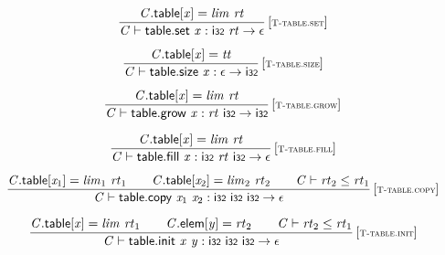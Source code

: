 $$
\begin{array}{@{}c@{}}\displaystyle
\frac{
{\mathit{C}}.\mathsf{table}{}[{\mathit{x}}] = {\mathit{lim}}~{\mathit{rt}}
}{
{\mathit{C}} \vdash \mathsf{table.set}~{\mathit{x}} : \mathsf{i{\scriptstyle32}}~{\mathit{rt}} \rightarrow \epsilon
} \, {[\textsc{\scriptsize T{-}table.set}]}
\qquad
\end{array}
$$

$$
\begin{array}{@{}c@{}}\displaystyle
\frac{
{\mathit{C}}.\mathsf{table}{}[{\mathit{x}}] = {\mathit{tt}}
}{
{\mathit{C}} \vdash \mathsf{table.size}~{\mathit{x}} : \epsilon \rightarrow \mathsf{i{\scriptstyle32}}
} \, {[\textsc{\scriptsize T{-}table.size}]}
\qquad
\end{array}
$$

$$
\begin{array}{@{}c@{}}\displaystyle
\frac{
{\mathit{C}}.\mathsf{table}{}[{\mathit{x}}] = {\mathit{lim}}~{\mathit{rt}}
}{
{\mathit{C}} \vdash \mathsf{table.grow}~{\mathit{x}} : {\mathit{rt}}~\mathsf{i{\scriptstyle32}} \rightarrow \mathsf{i{\scriptstyle32}}
} \, {[\textsc{\scriptsize T{-}table.grow}]}
\qquad
\end{array}
$$

$$
\begin{array}{@{}c@{}}\displaystyle
\frac{
{\mathit{C}}.\mathsf{table}{}[{\mathit{x}}] = {\mathit{lim}}~{\mathit{rt}}
}{
{\mathit{C}} \vdash \mathsf{table.fill}~{\mathit{x}} : \mathsf{i{\scriptstyle32}}~{\mathit{rt}}~\mathsf{i{\scriptstyle32}} \rightarrow \epsilon
} \, {[\textsc{\scriptsize T{-}table.fill}]}
\qquad
\end{array}
$$

$$
\begin{array}{@{}c@{}}\displaystyle
\frac{
{\mathit{C}}.\mathsf{table}{}[{\mathit{x}}_{{1}}] = {\mathit{lim}}_{{1}}~{\mathit{rt}}_{{1}}
 \qquad
{\mathit{C}}.\mathsf{table}{}[{\mathit{x}}_{{2}}] = {\mathit{lim}}_{{2}}~{\mathit{rt}}_{{2}}
 \qquad
{\mathit{C}} \vdash {\mathit{rt}}_{{2}} \leq {\mathit{rt}}_{{1}}
}{
{\mathit{C}} \vdash \mathsf{table.copy}~{\mathit{x}}_{{1}}~{\mathit{x}}_{{2}} : \mathsf{i{\scriptstyle32}}~\mathsf{i{\scriptstyle32}}~\mathsf{i{\scriptstyle32}} \rightarrow \epsilon
} \, {[\textsc{\scriptsize T{-}table.copy}]}
\qquad
\end{array}
$$

$$
\begin{array}{@{}c@{}}\displaystyle
\frac{
{\mathit{C}}.\mathsf{table}{}[{\mathit{x}}] = {\mathit{lim}}~{\mathit{rt}}_{{1}}
 \qquad
{\mathit{C}}.\mathsf{elem}{}[{\mathit{y}}] = {\mathit{rt}}_{{2}}
 \qquad
{\mathit{C}} \vdash {\mathit{rt}}_{{2}} \leq {\mathit{rt}}_{{1}}
}{
{\mathit{C}} \vdash \mathsf{table.init}~{\mathit{x}}~{\mathit{y}} : \mathsf{i{\scriptstyle32}}~\mathsf{i{\scriptstyle32}}~\mathsf{i{\scriptstyle32}} \rightarrow \epsilon
} \, {[\textsc{\scriptsize T{-}table.init}]}
\qquad
\end{array}
$$

